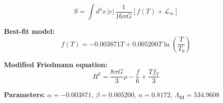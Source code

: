 
\begin{equation}
  S = \int d^4x \, |e| \, \frac{1}{16\pi G} \left[ f(T) + \mathcal{L}_m \right]
\end{equation}

\textbf{Best-fit model:}
\begin{equation}
  f(T) = -0.003871 T + 0.005200 T \ln\!\left(\frac{T}{T_0}\right)
\end{equation}

\textbf{Modified Friedmann equation:}
\begin{equation}
  H^2 = \frac{8\pi G}{3} \rho - \frac{f}{6} + \frac{T f_T}{3}
\end{equation}

\textbf{Parameters:}
$\alpha = -0.003871$, \quad
$\beta = 0.005200$, \quad
$n = 0.8172$, \quad
$\Lambda_{\text{BI}} = 534.9608$